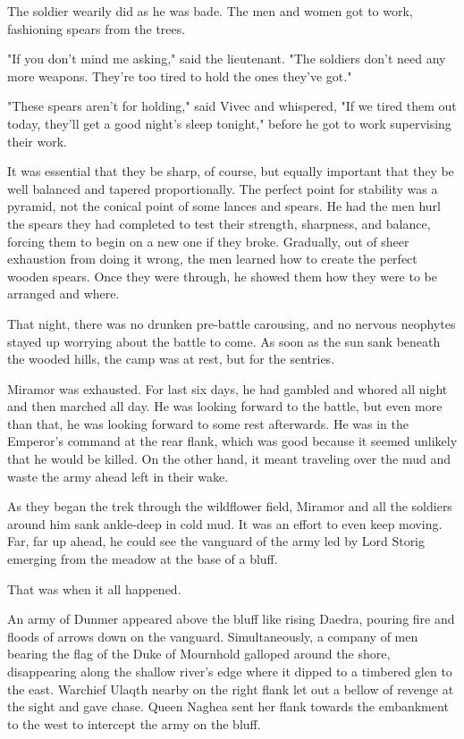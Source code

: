 The soldier wearily did as he was bade. The men and women got to work, fashioning spears from the trees.

"If you don't mind me asking," said the lieutenant. "The soldiers don't need any more weapons. They're too tired to hold the ones they've got."

"These spears aren't for holding," said Vivec and whispered, "If we tired them out today, they'll get a good night's sleep tonight," before he got to work supervising their work.

It was essential that they be sharp, of course, but equally important that they be well balanced and tapered proportionally. The perfect point for stability was a pyramid, not the conical point of some lances and spears. He had the men hurl the spears they had completed to test their strength, sharpness, and balance, forcing them to begin on a new one if they broke. Gradually, out of sheer exhaustion from doing it wrong, the men learned how to create the perfect wooden spears. Once they were through, he showed them how they were to be arranged and where.

That night, there was no drunken pre-battle carousing, and no nervous neophytes stayed up worrying about the battle to come. As soon as the sun sank beneath the wooded hills, the camp was at rest, but for the sentries.

Miramor was exhausted. For last six days, he had gambled and whored all night and then marched all day. He was looking forward to the battle, but even more than that, he was looking forward to some rest afterwards. He was in the Emperor's command at the rear flank, which was good because it seemed unlikely that he would be killed. On the other hand, it meant traveling over the mud and waste the army ahead left in their wake.

As they began the trek through the wildflower field, Miramor and all the soldiers around him sank ankle-deep in cold mud. It was an effort to even keep moving. Far, far up ahead, he could see the vanguard of the army led by Lord Storig emerging from the meadow at the base of a bluff.

That was when it all happened.

An army of Dunmer appeared above the bluff like rising Daedra, pouring fire and floods of arrows down on the vanguard. Simultaneously, a company of men bearing the flag of the Duke of Mournhold galloped around the shore, disappearing along the shallow river's edge where it dipped to a timbered glen to the east. Warchief Ulaqth nearby on the right flank let out a bellow of revenge at the sight and gave chase. Queen Naghea sent her flank towards the embankment to the west to intercept the army on the bluff.

